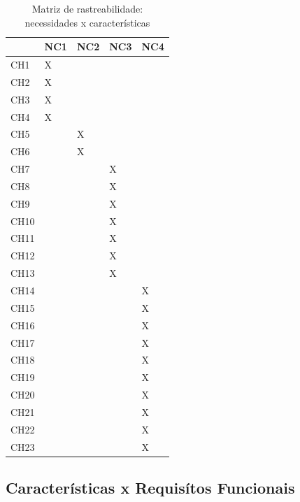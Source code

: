 \begin{table}[H]
  \centering
  \caption{Matriz de rastreabilidade: necessidades x características}
  \label{nc-ch}
  \begin{tabular}{|l|l|l|l|l|}
    \hline
         & NC1 & NC2 & NC3 & NC4 \\ \hline
    CH1  &  X   &     &     &     \\ \hline
    CH2  &  X   &     &     &     \\ \hline
    CH3  &  X   &     &     &     \\ \hline
    CH4  &  X   &     &     &     \\ \hline
    CH5  &     &  X   &     &     \\ \hline
    CH6  &     &  X   &     &     \\ \hline
    CH7  &     &     &  X   &     \\ \hline
    CH8  &     &     &  X  &     \\ \hline
    CH9  &     &     &  X   &     \\ \hline
    CH10 &     &     &  X   &     \\ \hline
    CH11 &     &     &  X   &     \\ \hline
    CH12 &     &     &  X   &     \\ \hline
    CH13 &     &     &  X   &     \\ \hline
    CH14 &     &     &     &   X  \\ \hline
    CH15 &     &     &     &   X  \\ \hline
    CH16 &     &     &     &   X  \\ \hline
    CH17 &     &     &     &   X  \\ \hline
    CH18 &     &     &     &   X  \\ \hline
    CH19 &     &     &     &   X  \\ \hline
    CH20 &     &     &     &   X  \\ \hline
    CH21 &     &     &     &   X  \\ \hline
    CH22 &     &     &     &   X  \\ \hline
    CH23 &     &     &     &   X  \\ \hline
  \end{tabular}
\end{table}

\subsection{Características x Requisítos Funcionais}

